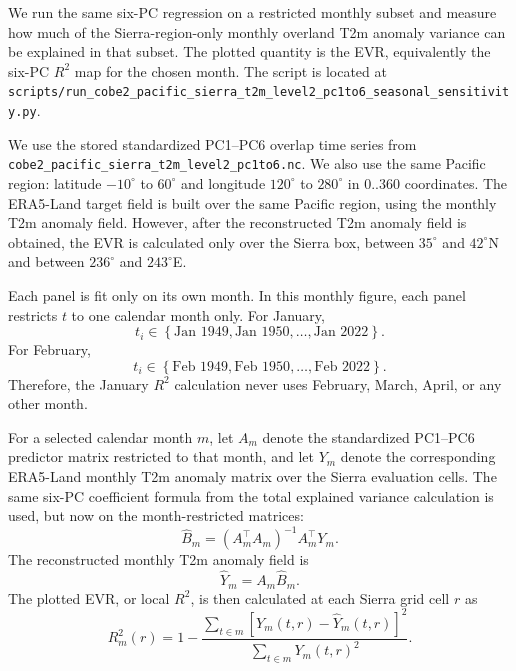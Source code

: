 \documentclass[11pt]{article}
\begin{document}
We run the same six-PC regression on a restricted monthly subset and measure how much of the
Sierra-region-only monthly overland T2m anomaly variance can be explained in that subset. The
plotted quantity is the EVR, equivalently the six-PC $R^2$ map for the chosen month. The script is
located at
\texttt{scripts/run\_cobe2\_pacific\_sierra\_t2m\_level2\_pc1to6\_seasonal\_sensitivity.py}.

We use the stored standardized PC1--PC6 overlap time series from
\texttt{cobe2\_pacific\_sierra\_t2m\_level2\_pc1to6.nc}. We also use the same Pacific region:
latitude $-10^\circ$ to $60^\circ$ and longitude $120^\circ$ to $280^\circ$ in $0..360$
coordinates. The ERA5-Land target field is built over the same Pacific region, using the monthly
T2m anomaly field. However, after the reconstructed T2m anomaly field is obtained, the EVR is
calculated only over the Sierra box, between $35^\circ$ and $42^\circ$N and between $236^\circ$ and
$243^\circ$E.

Each panel is fit only on its own month. In this monthly figure, each panel restricts $t$ to one
calendar month only. For January,
\begin{equation}
t_i \in
\left\{
\text{Jan 1949},
\text{Jan 1950},
\ldots,
\text{Jan 2022}
\right\}.
\end{equation}
For February,
\begin{equation}
t_i \in
\left\{
\text{Feb 1949},
\text{Feb 1950},
\ldots,
\text{Feb 2022}
\right\}.
\end{equation}
Therefore, the January $R^2$ calculation never uses February, March, April, or any other month.

For a selected calendar month $m$, let $A_m$ denote the standardized PC1--PC6 predictor matrix
restricted to that month, and let $Y_m$ denote the corresponding ERA5-Land monthly T2m anomaly
matrix over the Sierra evaluation cells. The same six-PC coefficient formula from the total
explained variance calculation is used, but now on the month-restricted matrices:
\begin{equation}
\widehat{B}_m
=
\left(A_m^\top A_m\right)^{-1} A_m^\top Y_m .
\end{equation}
The reconstructed monthly T2m anomaly field is
\begin{equation}
\widehat{Y}_m
=
A_m \widehat{B}_m .
\end{equation}
The plotted EVR, or local $R^2$, is then calculated at each Sierra grid cell $r$ as
\begin{equation}
R_m^2(r)
=
1
-
\frac{
\sum_{t \in m}
\left[
Y_m(t,r)-\widehat{Y}_m(t,r)
\right]^2
}{
\sum_{t \in m}
Y_m(t,r)^2
}.
\end{equation}
\end{document}
